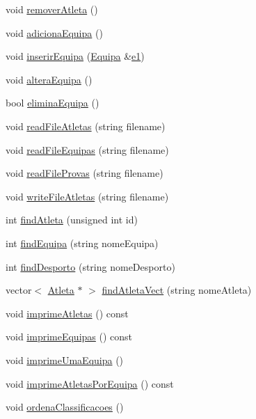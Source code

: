 \begin{DoxyCompactItemize}
\item 
void \hyperlink{class_campeonato_aa81be7f36c3daf7dc1f4d97f4274e953}{remover\+Atleta} ()
\item 
void \hyperlink{class_campeonato_a61f99e0dac86a67b21facebdc6a6d6a1}{adiciona\+Equipa} ()
\item 
void \hyperlink{class_campeonato_a5c09e9bc272f96875121ef9026c26434}{inserir\+Equipa} (\hyperlink{class_equipa}{Equipa} \&\hyperlink{main_8h_a94bd6f24df224a4dd936a7dba7521ff0}{e1})
\item 
void \hyperlink{class_campeonato_a79600008b0e5fc40b578da54519aee47}{altera\+Equipa} ()
\item 
bool \hyperlink{class_campeonato_a059f992f3a9932dbcf232541640b4b45}{elimina\+Equipa} ()
\item 
void \hyperlink{class_campeonato_a4f443b1fb65733062b40dd529d5ad63e}{read\+File\+Atletas} (string filename)
\item 
void \hyperlink{class_campeonato_a93f60ccc2608b0c99a978bc93fd881ac}{read\+File\+Equipas} (string filename)
\item 
void \hyperlink{class_campeonato_a4098bb3bde66ead9ecaa61e10aef2a5e}{read\+File\+Provas} (string filename)
\item 
void \hyperlink{class_campeonato_a8102c353a574b0ada7d35b537365a54e}{write\+File\+Atletas} (string filename)
\item 
int \hyperlink{class_campeonato_a662db361dc8464fa6ced60048e45ca1a}{find\+Atleta} (unsigned int id)
\item 
int \hyperlink{class_campeonato_a8002616a409e12a1ba2798d60c04f9dc}{find\+Equipa} (string nome\+Equipa)
\item 
int \hyperlink{class_campeonato_a64574dd8d105367c49d794a42e4a2aa8}{find\+Desporto} (string nome\+Desporto)
\item 
vector$<$ \hyperlink{class_atleta}{Atleta} $\ast$ $>$ \hyperlink{class_campeonato_abe0557f6d0fe33787a6d44e85fd8bda3}{find\+Atleta\+Vect} (string nome\+Atleta)
\item 
void \hyperlink{class_campeonato_a6a51ed1d4c6ca51bdc407144589d5894}{imprime\+Atletas} () const 
\item 
void \hyperlink{class_campeonato_a9e43dc72a8bf29c332209a37a8bdb1d8}{imprime\+Equipas} () const 
\item 
void \hyperlink{class_campeonato_a47a2b89c44b6705afa2478109d8b6b78}{imprime\+Uma\+Equipa} ()
\item 
void \hyperlink{class_campeonato_a4bbcc137067e9f72c169e22ce1c28858}{imprime\+Atletas\+Por\+Equipa} () const 
\item 
void \hyperlink{class_campeonato_ae1c0453864ac35ca78f076dd33c5c8a2}{ordena\+Classificacoes} ()
\end{DoxyCompactItemize}
